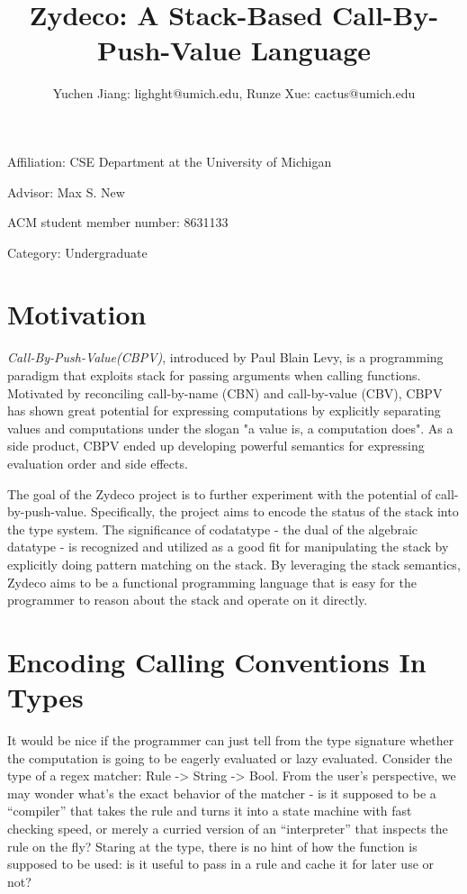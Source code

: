 \documentclass[acmsmall,nonacm]{acmart}
\title{Zydeco: A Stack-Based Call-By-Push-Value Language}
\author{Yuchen Jiang: lighght@umich.edu, Runze Xue: cactus@umich.edu}
\begin{document}
\renewcommand{\thesection}{\Alph{section}}
\maketitle
\noindent
Affiliation: CSE Department at the University of Michigan

\noindent
Advisor: Max S. New

\noindent
ACM student member number: 8631133

\noindent
Category: Undergraduate

\section{Motivation}

\textit{Call-By-Push-Value(CBPV)}, introduced by Paul Blain Levy, is a programming paradigm that exploits stack for passing arguments when calling functions. Motivated by reconciling call-by-name (CBN) and call-by-value (CBV), CBPV has shown great potential for expressing computations by explicitly separating values and computations under the slogan "a value is, a computation does". As a side product, CBPV ended up developing powerful semantics for expressing evaluation order and side effects.

The goal of the Zydeco project is to further experiment with the potential of call-by-push-value. Specifically, the project aims to encode the status of the stack into the type system. The significance of codatatype - the dual of the algebraic datatype - is recognized and utilized as a good fit for manipulating the stack by explicitly doing pattern matching on the stack. By leveraging the stack semantics, Zydeco aims to be a functional programming language that is easy for the programmer to reason about the stack and operate on it directly.

\section{Encoding Calling Conventions In Types}

It would be nice if the programmer can just tell from the type signature whether the computation is going to be eagerly evaluated or lazy evaluated. Consider the type of a regex matcher: Rule -> String -> Bool. From the user's perspective, we may wonder what's the exact behavior of the matcher - is it supposed to be a ``compiler'' that takes the rule and turns it into a state machine with fast checking speed, or merely a curried version of an ``interpreter'' that inspects the rule on the fly? Staring at the type, there is no hint of how the function is supposed to be used: is it useful to pass in a rule and cache it for later use or not?
\end{document}
